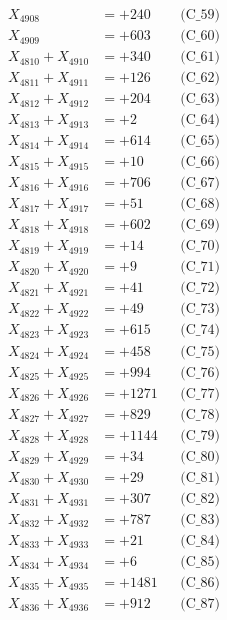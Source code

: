 \documentclass[a4paper,10pt]{article}
\begin{document}
{\begin{align}
X_{4908} &= +240 && \text{(C\_59)} \\
X_{4909} &= +603 && \text{(C\_60)} \\
\allowbreak
X_{4810} + X_{4910} &= +340 && \text{(C\_61)} \\
X_{4811} + X_{4911} &= +126 && \text{(C\_62)} \\
X_{4812} + X_{4912} &= +204 && \text{(C\_63)} \\
X_{4813} + X_{4913} &= +2 && \text{(C\_64)} \\
X_{4814} + X_{4914} &= +614 && \text{(C\_65)} \\
\allowbreak
X_{4815} + X_{4915} &= +10 && \text{(C\_66)} \\
X_{4816} + X_{4916} &= +706 && \text{(C\_67)} \\
X_{4817} + X_{4917} &= +51 && \text{(C\_68)} \\
X_{4818} + X_{4918} &= +602 && \text{(C\_69)} \\
X_{4819} + X_{4919} &= +14 && \text{(C\_70)} \\
\allowbreak
X_{4820} + X_{4920} &= +9 && \text{(C\_71)} \\
X_{4821} + X_{4921} &= +41 && \text{(C\_72)} \\
X_{4822} + X_{4922} &= +49 && \text{(C\_73)} \\
X_{4823} + X_{4923} &= +615 && \text{(C\_74)} \\
X_{4824} + X_{4924} &= +458 && \text{(C\_75)} \\
\allowbreak
X_{4825} + X_{4925} &= +994 && \text{(C\_76)} \\
X_{4826} + X_{4926} &= +1271 && \text{(C\_77)} \\
X_{4827} + X_{4927} &= +829 && \text{(C\_78)} \\
X_{4828} + X_{4928} &= +1144 && \text{(C\_79)} \\
X_{4829} + X_{4929} &= +34 && \text{(C\_80)} \\
\allowbreak
X_{4830} + X_{4930} &= +29 && \text{(C\_81)} \\
X_{4831} + X_{4931} &= +307 && \text{(C\_82)} \\
X_{4832} + X_{4932} &= +787 && \text{(C\_83)} \\
X_{4833} + X_{4933} &= +21 && \text{(C\_84)} \\
X_{4834} + X_{4934} &= +6 && \text{(C\_85)} \\
\allowbreak
X_{4835} + X_{4935} &= +1481 && \text{(C\_86)} \\
X_{4836} + X_{4936} &= +912 && \text{(C\_87)} \\

\end{align}}
\end{document}
